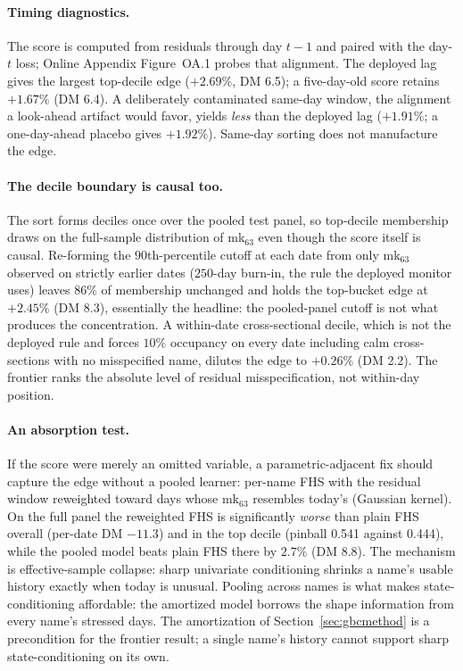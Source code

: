 \documentclass[11pt]{article}
\theoremstyle{remark}
\begin{document}
\paragraph{Timing diagnostics.} The score is computed from residuals
through day $t-1$ and paired with the day-$t$ loss; Online Appendix
Figure~OA.1 probes that alignment. The deployed lag gives the largest
top-decile edge ($+2.69\%$, DM 6.5); a five-day-old score retains
$+1.67\%$ (DM 6.4). A deliberately contaminated same-day window, the
alignment a look-ahead artifact would favor, yields \emph{less} than
the deployed lag ($+1.91\%$; a one-day-ahead placebo gives $+1.92\%$).
Same-day sorting does not manufacture the edge.

\paragraph{The decile boundary is causal too.} The sort forms deciles
once over the pooled test panel, so top-decile membership draws on the
full-sample distribution of mk$_{63}$ even though the score itself is
causal. Re-forming the $90$th-percentile cutoff at each date from only
mk$_{63}$ observed on strictly earlier dates ($250$-day burn-in, the
rule the deployed monitor uses) leaves $86\%$ of membership unchanged
and holds the top-bucket edge at $+2.45\%$ (DM 8.3), essentially the
headline: the pooled-panel cutoff is not what produces the
concentration. A within-date cross-sectional decile, which is not the
deployed rule and forces $10\%$ occupancy on every date including calm
cross-sections with no misspecified name, dilutes the edge to
$+0.26\%$ (DM 2.2). The frontier ranks the absolute level of residual
misspecification, not within-day position.

\paragraph{An absorption test.} If the score were merely an omitted
variable, a parametric-adjacent fix should capture the edge without a
pooled learner: per-name FHS with the residual window reweighted
toward days whose mk$_{63}$ resembles today's (Gaussian kernel). On
the full panel the reweighted FHS is significantly \emph{worse} than
plain FHS overall (per-date DM $-11.3$) and in the top decile (pinball
0.541 against 0.444), while the pooled model beats plain FHS there by
$2.7\%$ (DM 8.8). The mechanism is effective-sample collapse: sharp
univariate conditioning shrinks a name's usable history exactly when
today is unusual. Pooling across names is what makes state-conditioning affordable: the amortized model borrows the shape information from every name's
stressed days. The amortization of Section~\ref{sec:gbcmethod} is a
precondition for the frontier result; a single name's history cannot
support sharp state-conditioning on its own.
\end{document}
